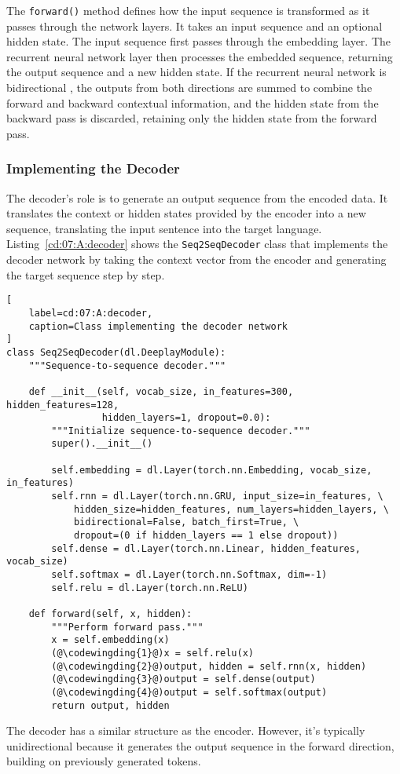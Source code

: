The \lstinline{forward()} method defines how the input sequence is transformed as it passes through the network layers. It takes an input sequence and an optional hidden state. The input sequence first passes through the embedding layer. The recurrent neural network layer then processes the embedded sequence, returning the output sequence and a new hidden state. If the recurrent neural network is bidirectional , the outputs from both directions are summed to combine the forward and backward contextual information, and the hidden state from the backward pass is discarded, retaining only the hidden state from the forward pass.

\subsubsection{Implementing the Decoder}

The decoder's role is to generate an output sequence from the encoded data. It translates the context or hidden states provided by the encoder into a new sequence, translating the input sentence into the target language. 
Listing~\ref{cd:07:A:decoder} shows the \lstinline{Seq2SeqDecoder} class that implements the decoder network by taking the context vector from the encoder and generating the target sequence step by step.
\begin{lstlisting}[
    label=cd:07:A:decoder,
    caption=Class implementing the decoder network
]
class Seq2SeqDecoder(dl.DeeplayModule):
    """Sequence-to-sequence decoder."""

    def __init__(self, vocab_size, in_features=300, hidden_features=128, 
                 hidden_layers=1, dropout=0.0):
        """Initialize sequence-to-sequence decoder."""
        super().__init__()

        self.embedding = dl.Layer(torch.nn.Embedding, vocab_size, in_features)
        self.rnn = dl.Layer(torch.nn.GRU, input_size=in_features, \
            hidden_size=hidden_features, num_layers=hidden_layers, \
            bidirectional=False, batch_first=True, \
            dropout=(0 if hidden_layers == 1 else dropout))
        self.dense = dl.Layer(torch.nn.Linear, hidden_features, vocab_size)
        self.softmax = dl.Layer(torch.nn.Softmax, dim=-1)
        self.relu = dl.Layer(torch.nn.ReLU)

    def forward(self, x, hidden):
        """Perform forward pass."""
        x = self.embedding(x)
        (@\codewingding{1}@)x = self.relu(x)
        (@\codewingding{2}@)output, hidden = self.rnn(x, hidden)
        (@\codewingding{3}@)output = self.dense(output)
        (@\codewingding{4}@)output = self.softmax(output)
        return output, hidden
\end{lstlisting}
The decoder has a similar structure as the encoder. However, it's typically unidirectional because it generates the output sequence in the forward direction, building on previously generated tokens. 

